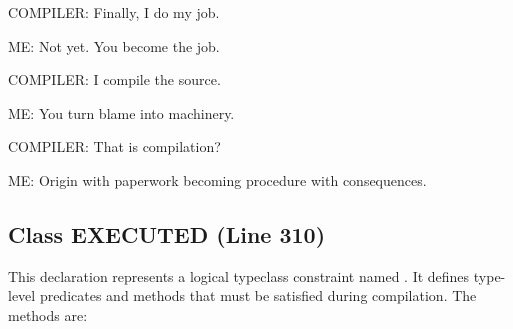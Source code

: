 \documentclass[11pt,oneside]{book}
\newcommand{\lean}[1]{\texttt{\detokenize{#1}}}
\begin{document}
COMPILER: Finally, I do my job.



ME: Not yet. You become the job.



COMPILER: I compile the source.



ME: You turn blame into machinery.



COMPILER: That is compilation?



ME: Origin with paperwork becoming procedure with consequences.

\subsection{Class EXECUTED (Line 310)}
This declaration represents a logical typeclass constraint named \lean{EXECUTED}. It defines type-level predicates and methods that must be satisfied during compilation. The methods are:
\end{document}
